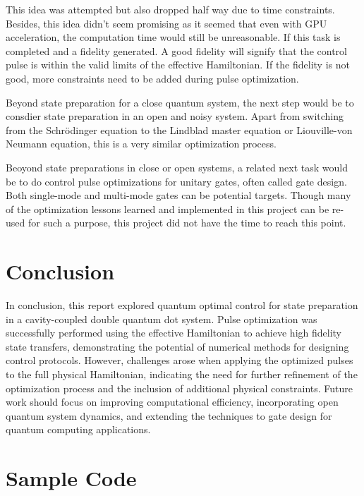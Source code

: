 \documentclass[12pt]{report}
\begin{document}
This idea was attempted but also dropped half way due to time constraints. 
Besides, this idea didn't seem promising as it seemed that even with GPU acceleration, the computation time would still be unreasonable. 
If this task is completed and a fidelity generated. A good fidelity will signify that the control pulse is within the valid limits of the effective Hamiltonian. 
If the fidelity is not good, more constraints need to be added during pulse optimization. 
\par
Beyond state preparation for a close quantum system, the next step would be to consdier state preparation in an open and noisy system. 
Apart from switching from the Schrödinger equation to the Lindblad master equation or Liouville-von Neumann equation, this is a very similar optimization process. 
\par
Beoyond state preparations in close or open systems, a related next task would be to do control pulse optimizations for unitary gates, often called gate design.
Both single-mode and multi-mode gates can be potential targets. Though many of the optimization lessons learned and implemented in this project can be re-used for such a purpose, this project did not have the time to reach this point. 

\chapter{Conclusion}
In conclusion, this report explored quantum optimal control for state preparation in a cavity-coupled double quantum dot system. 
Pulse optimization was successfully performed using the effective Hamiltonian to achieve high fidelity state transfers, demonstrating the potential of numerical methods for designing control protocols. 
However, challenges arose when applying the optimized pulses to the full physical Hamiltonian, indicating the need for further refinement of the optimization process and the inclusion of additional physical constraints. 
Future work should focus on improving computational efficiency, incorporating open quantum system dynamics, and extending the techniques to gate design for quantum computing applications.

\appendix
\chapter{Sample Code} \label{sec:sample_code}


\printbibliography
\end{document}
